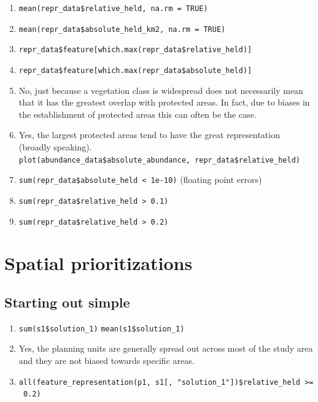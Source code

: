 \documentclass[12pt,]{book}
\providecommand{\tightlist}{%
  \setlength{\itemsep}{0pt}\setlength{\parskip}{0pt}}
\let\BeginKnitrBlock\begin \let\EndKnitrBlock\end
\begin{document}
\BeginKnitrBlock{rmdanswer}
\begin{enumerate}
\def\labelenumi{\arabic{enumi}.}
\tightlist
\item
  \texttt{mean(repr\_data\$relative\_held,\ na.rm\ =\ TRUE)}
\item
  \texttt{mean(repr\_data\$absolute\_held\_km2,\ na.rm\ =\ TRUE)}
\item
  \texttt{repr\_data\$feature{[}which.max(repr\_data\$relative\_held){]}}
\item
  \texttt{repr\_data\$feature{[}which.max(repr\_data\$absolute\_held){]}}
\item
  No, just because a vegetation class is widespread does not necessarily
  mean that it has the greatest overlap with protected areas. In fact,
  due to biases in the establishment of protected areas this can often
  be the case.
\item
  Yes, the largest protected areas tend to have the great representation
  (broadly speaking). \newline
  \texttt{plot(abundance\_data\$absolute\_abundance,\ repr\_data\$relative\_held)}
\item
  \texttt{sum(repr\_data\$absolute\_held\ \textless{}\ 1e-10)} (floating
  point errors)
\item
  \texttt{sum(repr\_data\$relative\_held\ \textgreater{}\ 0.1)}
\item
  \texttt{sum(repr\_data\$relative\_held\ \textgreater{}\ 0.2)}
\end{enumerate}
\EndKnitrBlock{rmdanswer}

\section{Spatial prioritizations}\label{spatial-prioritizations}

\subsection{Starting out simple}\label{starting-out-simple-1}

\BeginKnitrBlock{rmdanswer}
\begin{enumerate}
\def\labelenumi{\arabic{enumi}.}
\tightlist
\item
  \texttt{sum(s1\$solution\_1)} \newline
   \texttt{mean(s1\$solution\_1)}
\item
  Yes, the planning units are generally spread out across most of the
  study area and they are not biased towards specific areas.
\item
  \texttt{all(feature\_representation(p1,\ s1{[},\ "solution\_1"{]})\$relative\_held\ \textgreater{}=\ 0.2)}
\end{enumerate}
\EndKnitrBlock{rmdanswer}
\end{document}
